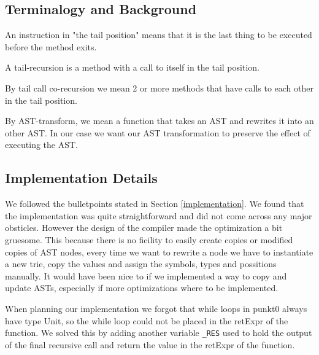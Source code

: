 \subsection{Terminalogy and Background}
An instruction in "the tail position" means that it is the last thing to be executed before the method exits.

A tail-recursion is a method with a call to itself in the tail position.

By tail call co-recursion we mean 2 or more methods that have calls to each other in the tail position.

By AST-transform, we mean a function that takes an AST and rewrites it into an other AST. In our case we want our AST transformation to preserve the effect of executing the AST.

\subsection{Implementation Details}
\label{sec:details}
We followed the bulletpoints stated in Section \ref{implementation}. We found that the implementation was quite straightforward and did not 
come across any major obsticles. However the design of the compiler made the optimization a bit gruesome. This because there is no ficility to easily create copies or modified copies of AST nodes,
every time we want to rewrite a node we have to instantiate a new trie, copy the values and assign the symbols, types and possitions manually. It would have been nice to if we implemented a way to copy and update ASTs, especially if more optimizations where to be implemented.

When planning our implementation we forgot that while loops in punkt0 always have type Unit, so the while loop could not be placed in the retExpr of the function. We solved this by adding another variable \texttt{\_RES} used to hold the output of the final recursive call and return the value in the retExpr of the function.
